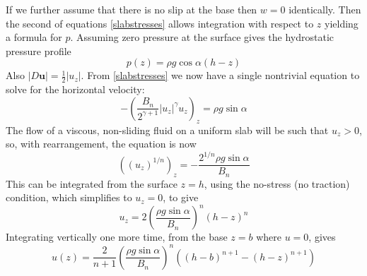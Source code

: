 \documentclass[letterpaper,final,12pt,reqno]{amsart}
\newcommand{\bu}{\mathbf{u}}
\begin{document}
If we further assume that there is no slip at the base then $w=0$ identically.  Then the second of equations \eqref{slabstresses} allows integration with respect to $z$ yielding a formula for $p$.  Assuming zero pressure at the surface gives the hydrostatic pressure profile
\begin{equation}
p(z) = \rho g\cos\alpha (h-z)  \label{pslab}
\end{equation}
Also $|D\bu| = \frac{1}{2} |u_z|$.  From \eqref{slabstresses} we now have a single nontrivial equation to solve for the horizontal velocity:
    $$- \left(\frac{B_n}{2^{\gamma+1}} |u_z|^\gamma u_z\right)_z = \rho g\sin\alpha$$
The flow of a viscous, non-sliding fluid on a uniform slab will be such that $u_z>0$, so, with rearrangement, the equation is now
    $$\left((u_z)^{1/n} \right)_z = - \frac{2^{1/n} \rho g\sin\alpha}{B_n}$$
This can be integrated from the surface $z=h$, using the no-stress (no traction) condition, which simplifies to $u_z=0$, to give
\begin{equation}
u_z = 2 \left(\frac{\rho g\sin\alpha}{B_n}\right)^n (h-z)^n  \label{uzslab}
\end{equation}
Integrating vertically one more time, from the base $z=b$ where $u=0$, gives
\begin{equation}
u(z) = \frac{2}{n+1} \left(\frac{\rho g\sin\alpha}{B_n}\right)^n \left((h-b)^{n+1} - (h-z)^{n+1}\right)  \label{uslab}
\end{equation}
\end{document}
